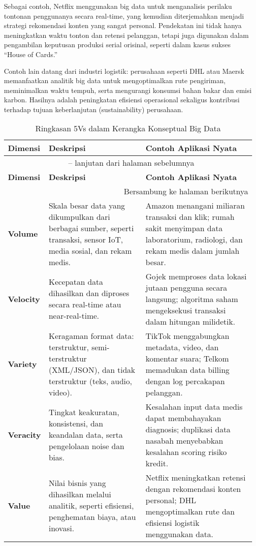 Sebagai contoh, Netflix menggunakan big data untuk menganalisis perilaku tontonan penggunanya secara real-time, yang kemudian diterjemahkan menjadi strategi rekomendasi konten yang sangat personal. Pendekatan ini tidak hanya meningkatkan waktu tonton dan retensi pelanggan, tetapi juga digunakan dalam pengambilan keputusan produksi serial orisinal, seperti dalam kasus sukses “House of Cards.”

Contoh lain datang dari industri logistik: perusahaan seperti DHL atau Maersk memanfaatkan analitik big data untuk mengoptimalkan rute pengiriman, meminimalkan waktu tempuh, serta mengurangi konsumsi bahan bakar dan emisi karbon. Hasilnya adalah peningkatan efisiensi operasional sekaligus kontribusi terhadap tujuan keberlanjutan (sustainability) perusahaan.

\begin{longtable}{|p{}|p{}|p{}|}
	\caption{Ringkasan 5Vs dalam Kerangka Konseptual Big Data}
	\label{tab:5vs} \\
	\hline
	\textbf{Dimensi} & \textbf{Deskripsi} & \textbf{Contoh Aplikasi Nyata} \\
	\hline
	\endfirsthead
	
	\multicolumn{3}{c}{{\tablename\ \thetable{} -- lanjutan dari halaman sebelumnya}} \\
	\hline
	\textbf{Dimensi} & \textbf{Deskripsi} & \textbf{Contoh Aplikasi Nyata} \\
	\hline
	\endhead
	
	\hline \multicolumn{3}{r}{{Bersambung ke halaman berikutnya}} \\
	\endfoot
	
	\hline
	\endlastfoot
	
	\textbf{Volume} & Skala besar data yang dikumpulkan dari berbagai sumber, seperti transaksi, sensor IoT, media sosial, dan rekam medis. & Amazon menangani miliaran transaksi dan klik; rumah sakit menyimpan data laboratorium, radiologi, dan rekam medis dalam jumlah besar. \\
	\hline
	\textbf{Velocity} & Kecepatan data dihasilkan dan diproses secara real-time atau near-real-time. & Gojek memproses data lokasi jutaan pengguna secara langsung; algoritma saham mengeksekusi transaksi dalam hitungan milidetik. \\
	\hline
	\textbf{Variety} & Keragaman format data: terstruktur, semi-terstruktur (XML/JSON), dan tidak terstruktur (teks, audio, video). & TikTok menggabungkan metadata, video, dan komentar suara; Telkom memadukan data billing dengan log percakapan pelanggan. \\
	\hline
	\textbf{Veracity} & Tingkat keakuratan, konsistensi, dan keandalan data, serta pengelolaan noise dan bias. & Kesalahan input data medis dapat membahayakan diagnosis; duplikasi data nasabah menyebabkan kesalahan scoring risiko kredit. \\
	\hline
	\textbf{Value} & Nilai bisnis yang dihasilkan melalui analitik, seperti efisiensi, penghematan biaya, atau inovasi. & Netflix meningkatkan retensi dengan rekomendasi konten personal; DHL mengoptimalkan rute dan efisiensi logistik menggunakan data. \\
	\hline
	

\end{longtable}
